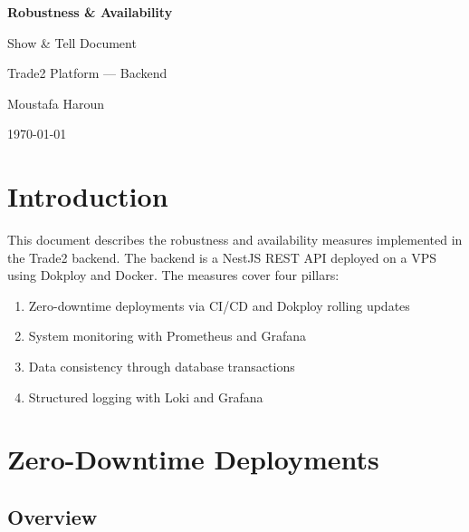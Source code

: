 \documentclass[12pt, a4paper]{article}
\begin{document}
\begin{titlepage}
    \centering
    \vspace*{2cm}
    {\Huge\bfseries Robustness \& Availability\par}
    \vspace{0.5cm}
    {\Large Show \& Tell Document\par}
    \vspace{0.5cm}
    {\large Trade2 Platform — Backend\par}
    \vfill
    {\large Moustafa Haroun\par}
    \vspace{0.3cm}
    {\large \today\par}
\end{titlepage}

\tableofcontents
\newpage

\section{Introduction}

This document describes the robustness and availability measures implemented in the Trade2 backend. The backend is a NestJS REST API deployed on a VPS using Dokploy and Docker. The measures cover four pillars:

\begin{enumerate}
    \item Zero-downtime deployments via CI/CD and Dokploy rolling updates
    \item System monitoring with Prometheus and Grafana
    \item Data consistency through database transactions
    \item Structured logging with Loki and Grafana
\end{enumerate}

\section{Zero-Downtime Deployments}

\subsection{Overview}
\end{document}
